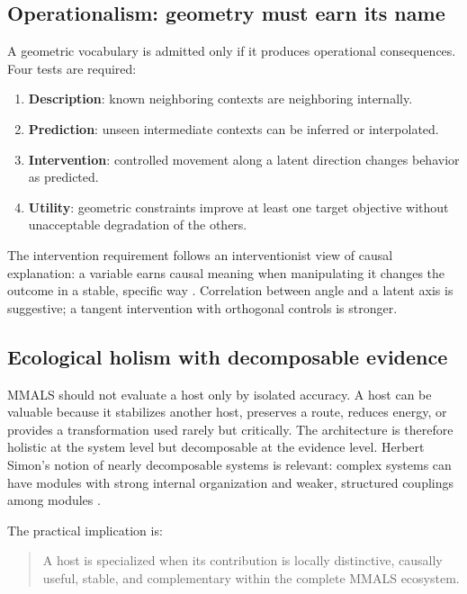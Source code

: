 \documentclass[11pt,a4paper]{article}
\begin{document}
\subsection{Operationalism: geometry must earn its name}

A geometric vocabulary is admitted only if it produces operational consequences. Four tests are required:

\begin{enumerate}
\item \textbf{Description}: known neighboring contexts are neighboring internally.
\item \textbf{Prediction}: unseen intermediate contexts can be inferred or interpolated.
\item \textbf{Intervention}: controlled movement along a latent direction changes behavior as predicted.
\item \textbf{Utility}: geometric constraints improve at least one target objective without unacceptable degradation of the others.
\end{enumerate}

The intervention requirement follows an interventionist view of causal explanation: a variable earns causal meaning when manipulating it changes the outcome in a stable, specific way \citep{woodward2003making}. Correlation between angle and a latent axis is suggestive; a tangent intervention with orthogonal controls is stronger.

\subsection{Ecological holism with decomposable evidence}

MMALS should not evaluate a host only by isolated accuracy. A host can be valuable because it stabilizes another host, preserves a route, reduces energy, or provides a transformation used rarely but critically. The architecture is therefore holistic at the system level but decomposable at the evidence level. Herbert Simon's notion of nearly decomposable systems is relevant: complex systems can have modules with strong internal organization and weaker, structured couplings among modules \citep{simon1962architecture}.

The practical implication is:

\begin{quote}
A host is specialized when its contribution is locally distinctive, causally useful, stable, and complementary within the complete MMALS ecosystem.
\end{quote}
\end{document}
